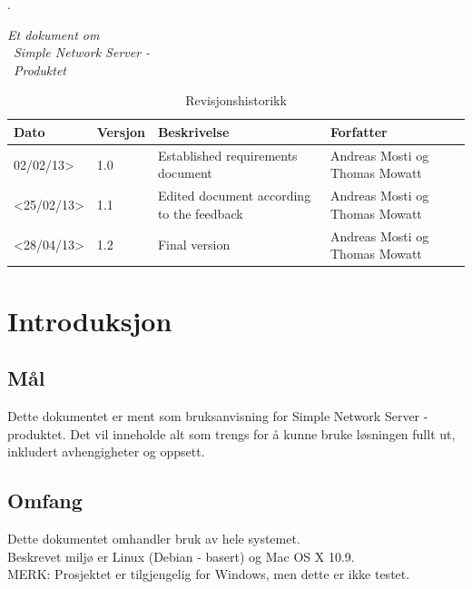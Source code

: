 \documentclass{article}
\begin{document}




\newpage
.\vfill
\begin{centering}
\LARGE


\textit{Et dokument om}  \\ 
\ \textit {Simple Network Server -} \\ 
\ \textit {Produktet}
\vspace{12cm}
\hspace{15cm}
\newpage
\end{centering} 
\pagestyle{fancy}
\setlength\headsep{30pt}


\begin{table}[h] %

\caption{Revisjonshistorikk}
	\begin{tabular}{| m{3cm} | m{1cm} | m{5cm} | m{4cm} |} 
	\hline	
	Dato & Versjon & Beskrivelse & Forfatter\\ 
	\hline
	 02/02/13> & 1.0 & Established requirements document & Andreas Mosti og Thomas Mowatt\\ 
	\hline
	<25/02/13> & 1.1 & Edited document according to the feedback & Andreas Mosti og Thomas Mowatt\\ 
	\hline
	<28/04/13> & 1.2 & Final version & Andreas Mosti og Thomas Mowatt\\ 
	\hline
	
	\end{tabular}
\end{table}

\newpage

\tableofcontents
\newpage
\section{Introduksjon}
\subsection{Mål}
Dette dokumentet er ment som bruksanvisning for Simple Network Server - produktet. Det vil inneholde alt som trengs for å kunne bruke løsningen fullt ut, inkludert avhengigheter og oppsett.
\subsection{Omfang}
Dette dokumentet omhandler bruk av hele systemet. \\ Beskrevet miljø er Linux (Debian - basert) og Mac OS X 10.9.
\\ MERK: Prosjektet er tilgjengelig for Windows, men dette er ikke testet. 
\end{document}
